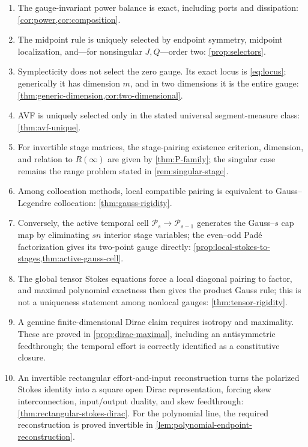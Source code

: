 \documentclass[11pt,a4paper]{article}
\begin{document}
\begin{enumerate}
  symplectic subfamily maps to \(O(Q)\cap Sp(\Omega)\).
  \item The gauge-invariant power balance is exact, including ports and
  dissipation: \cref{cor:power,cor:composition}.
  \item The midpoint rule is uniquely selected by endpoint symmetry,
  midpoint localization, and---for nonsingular \(J,Q\)---order two:
  \cref{prop:selectors}.
  \item Symplecticity does not select the zero gauge. Its exact locus is
  \cref{eq:locus}; generically it has dimension \(m\), and in two
  dimensions it is the entire gauge:
  \cref{thm:generic-dimension,cor:two-dimensional}.
  \item AVF is uniquely selected only in the stated universal
  segment-measure class: \cref{thm:avf-unique}.
  \item For invertible stage matrices, the stage-pairing existence
  criterion, dimension, and relation to \(R(\infty)\) are given by
  \cref{thm:P-family}; the singular case remains the range problem stated
  in \cref{rem:singular-stage}.
  \item Among collocation methods, local compatible pairing is equivalent
  to Gauss--Legendre collocation: \cref{thm:gauss-rigidity}.
  \item Conversely, the active temporal cell
  \(\mathcal P_s\to\mathcal P_{s-1}\) generates the Gauss--\(s\) cap map
  by eliminating \(sn\) interior stage variables; the even--odd Pad\'e
  factorization gives its two-point gauge directly:
  \cref{prop:local-stokes-to-stages,thm:active-gauss-cell}.
  \item The global tensor Stokes equations force a local diagonal pairing
  to factor, and maximal polynomial exactness then gives the product Gauss
  rule; this is not a uniqueness statement among nonlocal gauges:
  \cref{thm:tensor-rigidity}.
  \item A genuine finite-dimensional Dirac claim requires isotropy and
  maximality. These are proved in \cref{prop:dirac-maximal}, including an
  antisymmetric feedthrough; the temporal effort is correctly identified
  as a constitutive closure.
  \item An invertible rectangular effort-and-input reconstruction turns
  the polarized Stokes identity into a square open Dirac representation,
  forcing skew interconnection, input/output duality, and skew
  feedthrough: \cref{thm:rectangular-stokes-dirac}.  For the polynomial
  line, the required reconstruction is proved invertible in
  \cref{lem:polynomial-endpoint-reconstruction}.

\end{enumerate}
\end{document}
